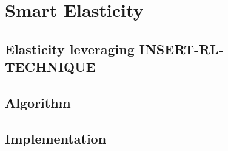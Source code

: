 \chapter{Smart Elasticity}
\label{chp:smart-elasticity}


\lipsum[1]


\section{Elasticity leveraging INSERT-RL-TECHNIQUE}
\label{sec:smart-elasticity-elasticity-leveraging}

\lipsum[1]


\section{Algorithm}
\label{sec:smart-elasticity-algorithm}

\lipsum[1]


\section{Implementation}
\label{sec:smart-elasticity-implementation}

\lipsum[1]